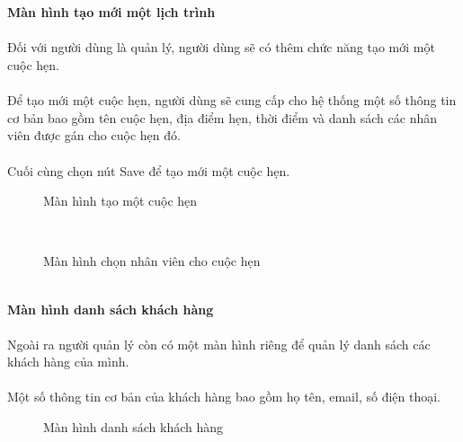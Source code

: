 \documentclass[a4paper]{article}
\begin{document}
\\
\\
\textbf{Màn hình tạo mới một lịch trình}\\\\
Đối với người dùng là quản lý, người dùng sẽ có thêm chức năng tạo mới một cuộc hẹn.\\\\
Để tạo mới một cuộc hẹn, người dùng sẽ cung cấp cho hệ thống một số thông tin cơ bản bao gồm tên cuộc hẹn, địa điểm hẹn, thời điểm và danh sách các nhân viên được gán cho cuộc hẹn đó.\\\\
Cuối cùng chọn nút Save để tạo mới một cuộc hẹn.\\
\begin{figure}[!h]
    \centering
    \caption{Màn hình tạo một cuộc hẹn}
    \label{fig:ui_employee_list}
\end{figure} 
\\
\begin{figure}[!h]
    \centering
    \caption{Màn hình chọn nhân viên cho cuộc hẹn}
    \label{fig:ui_employee_list}
\end{figure} 
\\
\clearpage
\noindent
\textbf{Màn hình danh sách khách hàng}\\\\
Ngoài ra người quản lý còn có một màn hình riêng để quản lý danh sách các khách hàng của mình.\\\\
Một số thông tin cơ bản của khách hàng bao gồm họ tên, email, số điện thoại.\\
\begin{figure}[!h]
    \centering
    \caption{Màn hình danh sách khách hàng}
    \label{fig:ui_employee_list}
\end{figure} 
\end{document}
